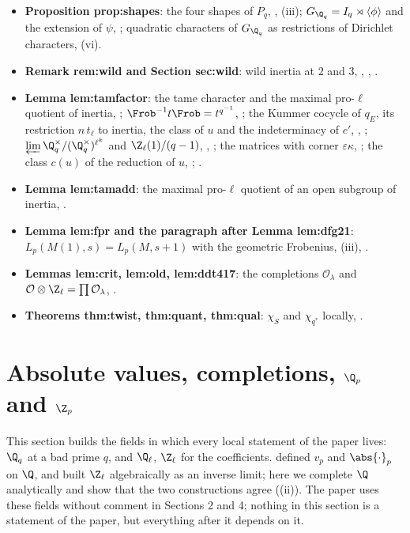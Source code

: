 \begin{itemize}
.
\item \textbf{Proposition prop:shapes}: the four shapes of $P_q$, , (iii); $G_{\Q_q}=I_q\rtimes\langle\phi\rangle$ and the
extension of $\psi$, ; quadratic characters of $G_{\Q_q}$ as restrictions of Dirichlet characters, (vi).
\item \textbf{Remark rem:wild and Section sec:wild}: wild inertia at $2$ and $3$, , , .
\item \textbf{Lemma lem:tamfactor}: the tame character and the maximal pro-$\ell$ quotient of inertia, ; $\Frob^{-1}t\Frob=t^{q^{-1}}$,
; the Kummer cocycle of $q_E$, its restriction $n\,t_\ell$ to inertia, the class of $u$ and the indeterminacy of $c'$,
, ; $\varprojlim\Q_q^\times/(\Q_q^\times)^{\ell^k}$ and $\Z_\ell(1)/(q-1)$, ,
; the matrices with corner $\varepsilon\kappa$, ; the class $c(u)$ of the reduction of $u$,
; .
\item \textbf{Lemma lem:tamadd}: the maximal pro-$\ell$ quotient of an open subgroup of inertia, .
\item \textbf{Lemma lem:fpr and the paragraph after Lemma lem:dfg21}: $L_p(M(1),s)=L_p(M,s+1)$ with the geometric Frobenius, (iii),
.
\item \textbf{Lemmas lem:crit, lem:old, lem:ddt417}: the completions $\mathcal O_\lambda$ and $\mathcal O\otimes\Z_\ell=\prod\mathcal O_\lambda$, .
\item \textbf{Theorems thm:twist, thm:quant, thm:qual}: $\chi_S$ and $\chi_{q^*}$ locally, .
\end{itemize}

\section{Absolute values, completions, \texorpdfstring{$\Q_p$}{Qp} and \texorpdfstring{$\Z_p$}{Zp}}\label{sec:local:qp}

This section builds the fields in which every local statement of the paper lives: $\Q_q$ at a bad prime $q$, and $\Q_\ell$,
$\Z_\ell$ for the coefficients.  defined $v_p$ and $\abs{\cdot}_p$ on $\Q$, and  built $\Z_\ell$
algebraically as an inverse limit; here we complete $\Q$ analytically and show that the two constructions agree
((ii)). The paper uses these fields without comment in Sections 2 and 4; nothing in this section is a
statement of the paper, but everything after it depends on it.

